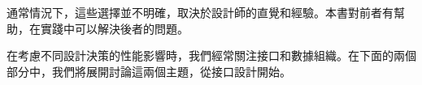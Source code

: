 通常情況下，這些選擇並不明確，取決於設計師的直覺和經驗。本書對前者有幫助，在實踐中可以解決後者的問題。 

在考慮不同設計決策的性能影響時，我們經常關注接口和數據組織。在下面的兩個部分中，我們將展開討論這兩個主題，從接口設計開始。








